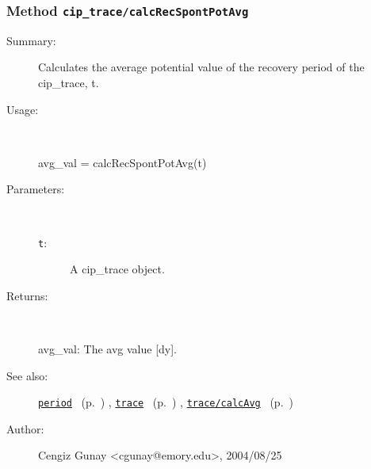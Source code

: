 \subsubsection[Method \texttt{calcRecSpontPotAvg}]{Method \texttt{cip\_trace/calcRecSpontPotAvg}}%
%
\label{ref_cip_trace__calcRecSpontPotAvg}%
\hypertarget{ref_cip_trace__calcRecSpontPotAvg}{}%
\begin{description}
\item[Summary:]Calculates the average potential value of the 
			recovery period of the cip\_trace, t. 
%
\item[Usage:]~%
\begin{lyxcode}%
avg\_val = calcRecSpontPotAvg(t)
%
\end{lyxcode}%
%
%
\item[Parameters:]~
\begin{description}%
\item[\texttt{t}:]
 A cip\_trace object.
\end{description}%
%
\item[Returns:]~

	avg\_val: The avg value [dy].
%
%
\item[See also:]%
\hyperlink{ref_period}{\texttt{period}}%
\ (p.~\pageref{ref_period})%
%
, \hyperlink{ref_trace}{\texttt{trace}}%
\ (p.~\pageref{ref_trace})%
%
, \hyperlink{ref_trace__calcAvg}{\texttt{trace/calcAvg}}%
\ (p.~\pageref{ref_trace__calcAvg})%
%
%
\item[Author:]%
Cengiz Gunay <cgunay@emory.edu>, 2004/08/25%
\end{description}
\methodline%
